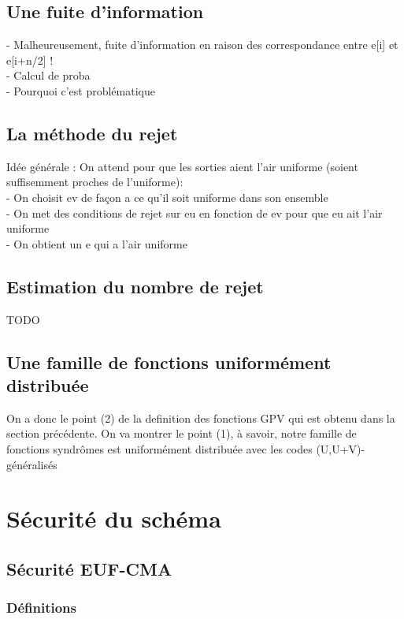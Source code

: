 \documentclass[12pt]{article}
\theoremstyle{definition}
\begin{document}
\subsection{Une fuite d'information}
- Malheureusement, fuite d'information en raison des correspondance entre e[i] et e[i+n/2] ! \\
- Calcul de proba \\
- Pourquoi c'est problématique \\ 

\subsection{La méthode du rejet}
Idée générale : On attend pour que les sorties aient l'air uniforme (soient suffisemment proches de l'uniforme): \\
- On choisit ev de façon a ce qu'il soit uniforme dans son ensemble \\
- On met des conditions de rejet sur eu en fonction de ev pour que eu ait l'air uniforme \\
- On obtient un e qui a l'air uniforme \\

\subsection{Estimation du nombre de rejet}
TODO \\

\subsection{Une famille de fonctions uniformément distribuée}
On a donc le point (2) de la definition des fonctions GPV qui est obtenu dans la section précédente. On va montrer le point (1), à savoir, notre famille de fonctions syndrômes est uniformément distribuée avec les codes (U,U+V)-généralisés \\

\section{Sécurité du schéma}

\subsection{Sécurité EUF-CMA}
\subsubsection{Définitions}
\end{document}
